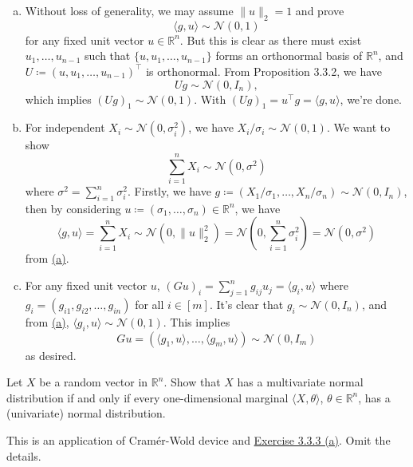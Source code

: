 \begin{answer}
	\begin{enumerate}[(a)]
		\item Without loss of generality, we may assume \(\lVert u \rVert _2 = 1\) and prove
		      \[
			      \langle g, u \rangle \sim \mathcal{N} (0, 1)
		      \]
		      for any fixed unit vector \(u \in \mathbb{R} ^n\). But this is clear as there must exist \(u_1, \dots , u_{n-1}\) such that \(\{ u, u_1, \dots , u_{n-1} \} \) forms an orthonormal basis of \(\mathbb{R} ^n\), and \(U \coloneqq (u, u_1, \dots , u_{n-1})^{\top} \) is orthonormal. From Proposition 3.3.2, we have
		      \[
			      Ug \sim \mathcal{N} (0, I_n),
		      \]
		      which implies \((Ug)_1 \sim \mathcal{N} (0, 1)\). With \((Ug)_1 = u^{\top} g = \langle g, u \rangle \), we're done.
		\item For independent \(X_i \sim \mathcal{N} (0, \sigma _i^2)\), we have \(X_i / \sigma _i \sim \mathcal{N} (0, 1)\). We want to show
		      \[
			      \sum_{i=1}^{n} X_i \sim \mathcal{N} (0, \sigma ^2)
		      \]
		      where \(\sigma ^2 = \sum_{i=1}^{n} \sigma _i^2\). Firstly, we have \(g \coloneqq (X_1 / \sigma _1, \dots , X_n / \sigma _n) \sim \mathcal{N} (0, I_n)\), then by considering \(u \coloneqq (\sigma _1, \dots , \sigma _n) \in \mathbb{R} ^n\), we have
		      \[
			      \langle g, u \rangle
			      = \sum_{i=1}^{n} X_i
			      \sim \mathcal{N} (0, \lVert u \rVert _2^2)
			      = \mathcal{N} \left( 0, \sum_{i=1}^{n} \sigma _i^2 \right)
			      = \mathcal{N} (0, \sigma ^2)
		      \]
		      from \hyperref[ex3.3.3:a]{(a)}.
		\item For any fixed unit vector \(u\), \((Gu)_i = \sum_{j=1}^{n} g_{ij} u_j = \langle g_i, u \rangle \) where \(g_i = (g_{i1}, g_{i2}, \dots , g_{in})\) for all \(i \in [m]\). It's clear that \(g_i \sim \mathcal{N} (0, I_n)\), and from \hyperref[ex3.3.3:a]{(a)}, \(\langle g_i, u \rangle \sim \mathcal{N} (0, 1)\). This implies
		      \[
			      Gu = (\langle g_1, u \rangle , \dots , \langle g_m, u \rangle )
			      \sim \mathcal{N} (0, I_m)
		      \]
		      as desired.
	\end{enumerate}
\end{answer}

\begin{problem*}[Exercise 3.3.4]\label{ex3.3.4}
	Let \(X\) be a random vector in \(\mathbb{R} ^n\). Show that \(X\) has a multivariate normal distribution if and only if every one-dimensional marginal \(\langle X, \theta  \rangle \), \(\theta \in \mathbb{R} ^n\), has a (univariate) normal distribution.
\end{problem*}
\begin{answer}
	This is an application of Cramér-Wold device and \hyperref[ex3.3.3:a]{Exercise 3.3.3 (a)}. Omit the details.
\end{answer}

